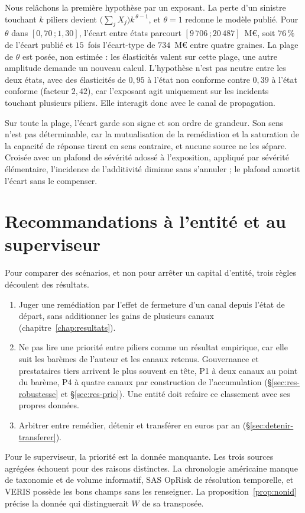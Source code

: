 Nous relâchons la première hypothèse par un exposant. La perte d'un sinistre touchant $k$ piliers
devient $\bigl(\sum_j X_j\bigr)k^{\,\theta-1}$, et $\theta=1$ redonne le modèle publié. Pour $\theta$ dans $[0{,}70\,;1{,}30]$, l'écart entre états parcourt
$[9\,706\,;20\,487]$~M\euro, soit $76\,\%$ de l'écart publié et $15$~fois l'écart-type de $734$~M\euro{}
entre quatre graines. La plage de $\theta$ est posée, non estimée : les élasticités valent sur cette plage,
une autre amplitude demande un nouveau calcul. L'hypothèse n'est pas neutre
entre les deux états, avec des élasticités de $0{,}95$ à l'état non conforme contre $0{,}39$ à l'état
conforme (facteur $2{,}42$), car l'exposant agit uniquement sur les incidents touchant plusieurs piliers. Elle
interagit donc avec le canal de propagation.

Sur toute la plage, l'écart garde son signe et son ordre de grandeur. Son sens n'est pas déterminable, car la mutualisation de la remédiation et la
saturation de la capacité de réponse tirent en sens contraire, et aucune source ne les sépare.
Croisée avec un plafond de sévérité adossé à l'exposition, appliqué par sévérité élémentaire, l'incidence de l'additivité diminue sans
s'annuler ; le plafond amortit l'écart sans le compenser.




\section{Recommandations à l'entité et au superviseur}
\label{ch:livrable}

Pour comparer des scénarios, et non pour arrêter un capital d'entité, trois règles découlent des résultats.
\begin{enumerate}[leftmargin=*,nosep]
\item Juger une remédiation par l'effet de fermeture d'un canal depuis l'état de départ, sans
additionner les gains de plusieurs canaux (chapitre~\ref{chap:resultats}).
\item Ne pas lire une priorité entre piliers comme un résultat empirique, car elle suit les barèmes de l'auteur et
les canaux retenus. Gouvernance et prestataires tiers arrivent le plus souvent en tête, P1 à deux canaux au
point du barème, P4 à quatre canaux par construction de l'accumulation (\S\ref{sec:res-robustesse} et
\S\ref{sec:res-prio}). Une entité doit refaire ce classement avec ses propres données.
\item Arbitrer entre remédier, détenir et transférer en euros par an (\S\ref{sec:detenir-transferer}).
\end{enumerate}
Pour le superviseur, la priorité est la donnée manquante. Les trois sources agrégées échouent pour des raisons distinctes. La chronologie américaine manque de
taxonomie et de volume informatif, SAS OpRisk de résolution temporelle, et VERIS possède les bons
champs sans les renseigner. La proposition~\ref{prop:nonid} précise la donnée qui distinguerait $W$ de sa transposée.

